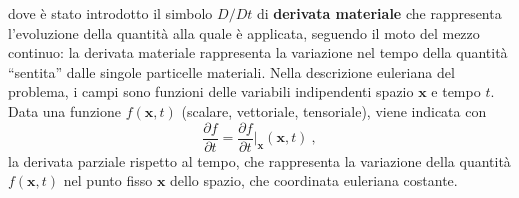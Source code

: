 dove è stato introdotto il simbolo $D/Dt$ di \textbf{derivata materiale} che rappresenta l'evoluzione della quantità alla quale è applicata, seguendo il moto del mezzo continuo: la derivata materiale rappresenta la variazione nel tempo della quantità ``sentita'' dalle singole particelle materiali.
%
 Nella descrizione euleriana del problema, i campi sono funzioni delle variabili indipendenti spazio $\bm{x}$ e tempo $t$. Data una funzione $f(\bm{x},t)$ (scalare, vettoriale, tensoriale), viene indicata con
 \begin{equation}
 \dfrac{\partial f}{\partial t} = \dfrac{\partial f}{\partial t}\bigg|_{\bm{x}}(\bm{x},t) \ ,
 \end{equation}
 la derivata parziale rispetto al tempo, che rappresenta la variazione della quantità $f(\bm{x},t)$ nel punto fisso $\bm{x}$ dello spazio, che coordinata euleriana costante.

